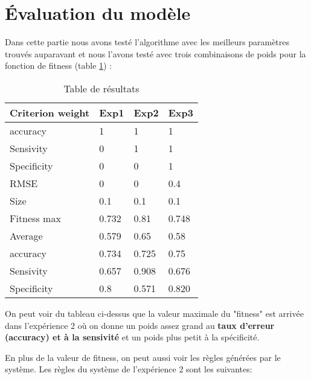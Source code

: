 \newpage
\section*{Évaluation du modèle}

Dans cette partie nous avons testé l'algorithme avec les meilleurs paramètres trouvés auparavant et nous l'avons testé avec trois combinaisons de poids pour la fonction de fitness (table \ref{table_param}) :


\begin{table}[h]
  \centering
  \begin{tabular}{|l|l|l|l|}
  \hline
  \textbf{Criterion weight} & \textbf{Exp1} & \textbf{Exp2} & \textbf{Exp3} \\ \hline
  accuracy                 & 1             & 1             & 1             \\ \hline
  Sensivity                & 0             & 1             & 1             \\ \hline
  Specificity              & 0             & 0             & 1             \\ \hline
  RMSE                     & 0             & 0             & 0.4           \\ \hline
  Size                     & 0.1           & 0.1           & 0.1           \\ \hline
  Fitness max              & 0.732         & 0.81          & 0.748         \\ \hline
  Average                  & 0.579         & 0.65          & 0.58          \\ \hline
  accuracy                 & 0.734         & 0.725         & 0.75          \\ \hline
  Sensivity                & 0.657         & 0.908         & 0.676         \\ \hline
  Specificity              & 0.8           & 0.571         & 0.820         \\ \hline
  \end{tabular}
  \caption{\label{table_param} Table de résultats}
\end{table}

On peut voir du tableau ci-dessus que la valeur maximale du "fitness" est arrivée dans l'expérience 2 où on donne un poids assez grand au \textbf{taux d'erreur (accuracy) et à la sensivité} et un poids plus petit à la spécificité.


En plus de la valeur de fitness, on peut aussi voir les règles générées par le système. Les règles du système de l'expérience 2 sont les suivantes:

